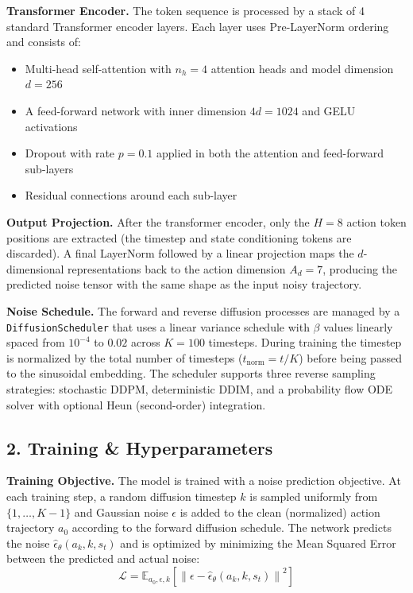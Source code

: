 \documentclass[11pt,a4paper]{article}
\begin{document}
\textbf{Transformer Encoder.}
The token sequence is processed by a stack of 4 standard Transformer encoder layers. Each layer uses Pre-LayerNorm ordering and consists of:
\begin{itemize}
    \item Multi-head self-attention with $n_h = 4$ attention heads and model dimension $d = 256$
    \item A feed-forward network with inner dimension $4d = 1024$ and GELU activations
    \item Dropout with rate $p = 0.1$ applied in both the attention and feed-forward sub-layers
    \item Residual connections around each sub-layer
\end{itemize}

\textbf{Output Projection.}
After the transformer encoder, only the $H = 8$ action token positions are extracted (the timestep and state conditioning tokens are discarded). A final LayerNorm followed by a linear projection maps the $d$-dimensional representations back to the action dimension $A_d = 7$, producing the predicted noise tensor with the same shape as the input noisy trajectory.

\textbf{Noise Schedule.}
The forward and reverse diffusion processes are managed by a \texttt{DiffusionScheduler} that uses a linear variance schedule with $\beta$ values linearly spaced from $10^{-4}$ to $0.02$ across $K = 100$ timesteps. During training the timestep is normalized by the total number of timesteps ($t_{\text{norm}} = t / K$) before being passed to the sinusoidal embedding. The scheduler supports three reverse sampling strategies: stochastic DDPM, deterministic DDIM, and a probability flow ODE solver with optional Heun (second-order) integration.

\subsection*{2. Training \& Hyperparameters}

\textbf{Training Objective.}
The model is trained with a noise prediction objective. At each training step, a random diffusion timestep $k$ is sampled uniformly from $\{1, \ldots, K-1\}$ and Gaussian noise $\epsilon$ is added to the clean (normalized) action trajectory $a_0$ according to the forward diffusion schedule. The network predicts the noise $\hat{\epsilon}_\theta(a_k, k, s_t)$ and is optimized by minimizing the Mean Squared Error between the predicted and actual noise:
\[ \mathcal{L} = \mathbb{E}_{a_0, \epsilon, k} \left[ \left\| \epsilon - \hat{\epsilon}_\theta(a_k, k, s_t) \right\|^2 \right] \]
\end{document}
